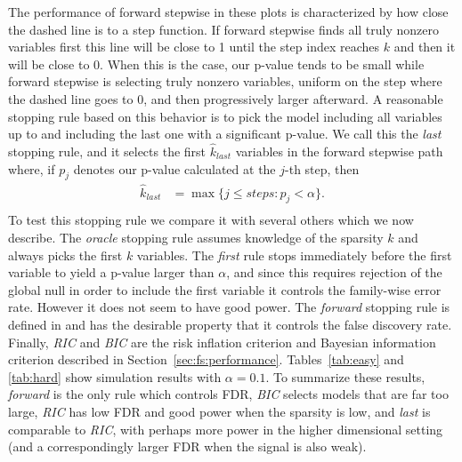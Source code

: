 \documentclass{imsart}
\begin{document}
The performance of forward stepwise in these plots is characterized by how
close the dashed line is to a step function. If forward stepwise finds all
truly nonzero variables first this line will be close to 1 until the step
index reaches $k$ and then it will be close to 0. When this is the case,
our p-value tends to be small while forward stepwise is selecting truly
nonzero variables, uniform on the step where the dashed line goes to 0,
and then progressively larger afterward. A reasonable stopping rule based
on this behavior is to pick the model including all variables up to and
including the last one with a significant p-value. We call this the
\textit{last} stopping rule, and it selects the first $\hat k_\textit{last}$
variables in the forward stepwise path where, if
$p_j$ denotes our p-value calculated at the $j$-th step, then
\begin{equation}
  \label{eq:klast}
  \begin{aligned}
    \hat k_\textit{last} & = \max \{ j \leq steps : p_j < \alpha \}. \\
  \end{aligned}
\end{equation}
To test this stopping rule we compare it with several others which we now
describe. The \textit{oracle} stopping rule assumes knowledge of the
sparsity $k$ and always picks the first $k$ variables. The \textit{first}
rule stops immediately before the first variable to yield a p-value
larger than $\alpha$, and since this requires rejection of the global 
null in order to include the first variable
it controls the family-wise error rate. However it does not seem to have
good power.
The \textit{forward}
stopping rule is defined in \cite{sequential:fdr} and has the desirable
property that it controls the false discovery rate. Finally, \textit{RIC}
and \textit{BIC}
are the risk inflation criterion and Bayesian information criterion
described in Section~\ref{sec:fs:performance}. Tables~\ref{tab:easy} and
\ref{tab:hard} show simulation results with $\alpha = 0.1$.
To summarize these results, \textit{forward} is the only rule which
controls FDR, \textit{BIC} selects models that are far too large,
\textit{RIC} has low FDR and good power when the sparsity is low,
and \textit{last} is comparable to \textit{RIC},
with perhaps more power in the higher dimensional setting
(and a correspondingly larger FDR when the signal is also weak).





\end{document}
